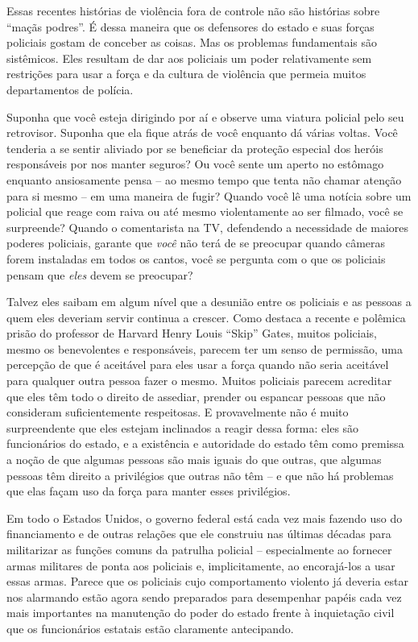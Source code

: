 Essas recentes histórias de violência fora de controle não são histórias sobre ``maçãs podres''. É dessa maneira que os defensores do estado e suas forças policiais gostam de conceber as coisas. Mas os problemas fundamentais são sistêmicos. Eles resultam de dar aos policiais um poder relativamente sem restrições para usar a força e da cultura de violência que permeia muitos departamentos de polícia.

Suponha que você esteja dirigindo por aí e observe uma viatura policial pelo seu retrovisor. Suponha que ela fique atrás de você enquanto dá várias voltas. Você tenderia a se sentir aliviado por se beneficiar da proteção especial dos heróis responsáveis por nos manter seguros? Ou você sente um aperto no estômago enquanto ansiosamente pensa -- ao mesmo tempo que tenta não chamar atenção para si mesmo -- em uma maneira de fugir? Quando você lê uma notícia sobre um policial que reage com raiva ou até mesmo violentamente ao ser filmado, você se surpreende? Quando o comentarista na TV, defendendo a necessidade de maiores poderes policiais, garante que \emph{você} não terá de se preocupar quando câmeras forem instaladas em todos os cantos, você se pergunta com o que os policiais pensam que \emph{eles} devem se preocupar?

Talvez eles saibam em algum nível que a desunião entre os policiais e as pessoas a quem eles deveriam servir continua a crescer. Como destaca a recente e polêmica prisão do professor de Harvard Henry Louis ``Skip'' Gates, muitos policiais, mesmo os benevolentes e responsáveis, parecem ter um senso de permissão, uma percepção de que é aceitável para eles usar a força quando não seria aceitável para qualquer outra pessoa fazer o mesmo. Muitos policiais parecem acreditar que eles têm todo o direito de assediar, prender ou espancar pessoas que não consideram suficientemente respeitosas. E provavelmente não é muito surpreendente que eles estejam inclinados a reagir dessa forma: eles são funcionários do estado, e a existência e autoridade do estado têm como premissa a noção de que algumas pessoas são mais iguais do que outras, que algumas pessoas têm direito a privilégios que outras não têm -- e que não há problemas que elas façam uso da força para manter esses privilégios.

Em todo o Estados Unidos, o governo federal está cada vez mais fazendo uso do financiamento e de outras relações que ele construiu nas últimas décadas para militarizar as funções comuns da patrulha policial -- especialmente ao fornecer armas militares de ponta aos policiais e, implicitamente, ao encorajá-los a usar essas armas. Parece que os policiais cujo comportamento violento já deveria estar nos alarmando estão agora sendo preparados para desempenhar papéis cada vez mais importantes na manutenção do poder do estado frente à inquietação civil que os funcionários estatais estão claramente antecipando.

